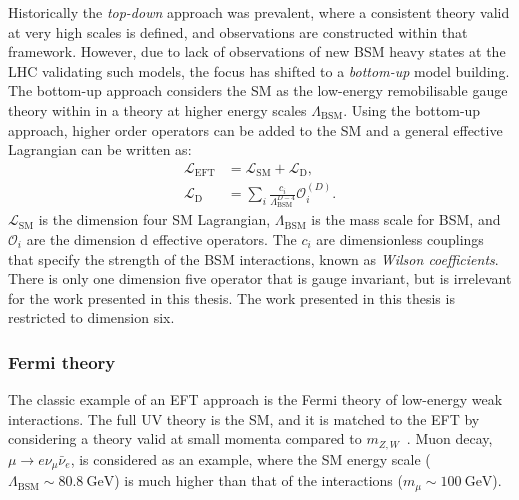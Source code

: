 Historically the \emph{top-down} approach was prevalent, where a consistent theory valid at very high scales is defined, and observations are constructed within that framework. However, due to lack of observations of new BSM heavy states at the LHC validating such models, the focus has shifted to a \emph{bottom-up} model building. The bottom-up approach considers the SM as the low-energy remobilisable gauge theory within in a theory at higher energy scales $\Lambda_{\mathrm{BSM}}$. Using the bottom-up approach, higher order operators can be added to the SM and a general effective Lagrangian can be written as: 
\begin{equation}
    \label{eq:eftLagrangian}
    \begin{aligned}
        \mathcal{L}_\mathrm{EFT} &=  \mathcal{L}_\mathrm{SM} +  \mathcal{L}_\mathrm{D},\\
        \mathcal{L}_\mathrm{D}   &= \sum_i \frac{c_i}{\Lambda_{\mathrm{BSM}}^{D-4}}\mathcal{O}^{(D)}_i.
     \end{aligned}
\end{equation}
$\mathcal{L}_\mathrm{SM}$ is the dimension four SM Lagrangian, $\Lambda_{\mathrm{BSM}}$ is the mass scale for BSM, and $\mathcal{O}_i$ are the dimension d effective operators. The $c_i$ are dimensionless couplings that specify the strength of the BSM interactions, known as \emph{Wilson coefficients}. There is only one dimension five operator that is gauge invariant, but is irrelevant for the work presented in this thesis. The work presented in this thesis is restricted to dimension six. 
\subsubsection{Fermi theory}
The classic example of an EFT approach is the Fermi theory of low-energy weak interactions. The full UV theory is the SM, and it is matched to the EFT by considering a theory valid at small momenta compared to $m_{Z,W}$~\cite{manohar2018introduction}. Muon decay, $\mu \rightarrow e\nu_\mu\bar{\nu}_e$, is considered as an example, where the SM energy scale ($\Lambda_{\mathrm{BSM}}\sim\SI{80.8}{\giga\electronvolt}$) is much higher than that of the interactions ($m_\mu \sim \SI{100}{\giga\electronvolt}$). 

